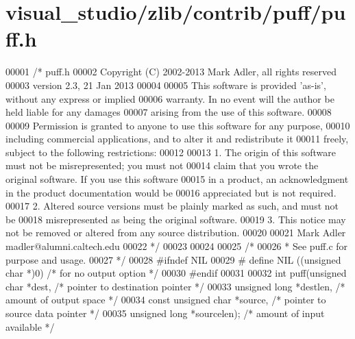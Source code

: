 \hypertarget{visual__studio_2zlib_2contrib_2puff_2puff_8h_source}{}\section{visual\+\_\+studio/zlib/contrib/puff/puff.h}
\label{visual__studio_2zlib_2contrib_2puff_2puff_8h_source}

\begin{DoxyCode}
00001 \textcolor{comment}{/* puff.h}
00002 \textcolor{comment}{  Copyright (C) 2002-2013 Mark Adler, all rights reserved}
00003 \textcolor{comment}{  version 2.3, 21 Jan 2013}
00004 \textcolor{comment}{}
00005 \textcolor{comment}{  This software is provided 'as-is', without any express or implied}
00006 \textcolor{comment}{  warranty.  In no event will the author be held liable for any damages}
00007 \textcolor{comment}{  arising from the use of this software.}
00008 \textcolor{comment}{}
00009 \textcolor{comment}{  Permission is granted to anyone to use this software for any purpose,}
00010 \textcolor{comment}{  including commercial applications, and to alter it and redistribute it}
00011 \textcolor{comment}{  freely, subject to the following restrictions:}
00012 \textcolor{comment}{}
00013 \textcolor{comment}{  1. The origin of this software must not be misrepresented; you must not}
00014 \textcolor{comment}{     claim that you wrote the original software. If you use this software}
00015 \textcolor{comment}{     in a product, an acknowledgment in the product documentation would be}
00016 \textcolor{comment}{     appreciated but is not required.}
00017 \textcolor{comment}{  2. Altered source versions must be plainly marked as such, and must not be}
00018 \textcolor{comment}{     misrepresented as being the original software.}
00019 \textcolor{comment}{  3. This notice may not be removed or altered from any source distribution.}
00020 \textcolor{comment}{}
00021 \textcolor{comment}{  Mark Adler    madler@alumni.caltech.edu}
00022 \textcolor{comment}{ */}
00023 
00024 
00025 \textcolor{comment}{/*}
00026 \textcolor{comment}{ * See puff.c for purpose and usage.}
00027 \textcolor{comment}{ */}
00028 \textcolor{preprocessor}{#ifndef NIL}
00029 \textcolor{preprocessor}{#  define NIL ((unsigned char *)0)      }\textcolor{comment}{/* for no output option */}\textcolor{preprocessor}{}
00030 \textcolor{preprocessor}{#endif}
00031 
00032 \textcolor{keywordtype}{int} puff(\textcolor{keywordtype}{unsigned} \textcolor{keywordtype}{char} *dest,           \textcolor{comment}{/* pointer to destination pointer */}
00033          \textcolor{keywordtype}{unsigned} \textcolor{keywordtype}{long} *destlen,        \textcolor{comment}{/* amount of output space */}
00034          \textcolor{keyword}{const} \textcolor{keywordtype}{unsigned} \textcolor{keywordtype}{char} *source,   \textcolor{comment}{/* pointer to source data pointer */}
00035          \textcolor{keywordtype}{unsigned} \textcolor{keywordtype}{long} *sourcelen);     \textcolor{comment}{/* amount of input available */}
\end{DoxyCode}

